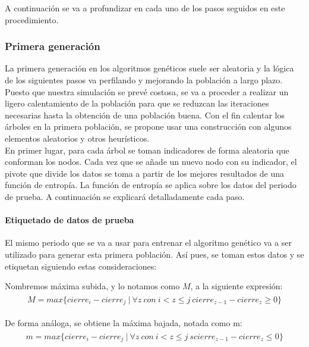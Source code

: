 A continuaci\'on se va a profundizar en cada uno de los pasos seguidos en este procedimiento.\\

\subsubsection{Primera generaci\'on}
La primera generaci\'on en los algoritmos gen\'eticos suele ser aleatoria y la l\'ogica de los siguientes pasos va perfilando y mejorando la poblaci\'on a largo plazo.\\

Puesto que nuestra simulaci\'on se prev\'e costosa, se va a proceder a realizar un ligero calentamiento de la poblaci\'on para que se reduzcan las iteraciones necesarias hasta la obtenci\'on de una poblaci\'on buena. Con el fin calentar los \'arboles en la primera poblaci\'on, se propone usar una construcci\'on con algunos elementos aleatorios y otros heur\'isticos.\\

En primer lugar, para cada \'arbol se toman indicadores de forma aleatoria que conforman los nodos. Cada vez que se a\~nade un nuevo nodo con su indicador, el pivote que divide los datos se toma a partir de los mejores resultados de una funci\'on de entrop\'ia. La funci\'on de entrop\'ia se aplica sobre los datos del periodo de prueba. A continuaci\'on se explicar\'a detalladamente cada paso. \\

\paragraph{Etiquetado de datos de prueba}
El mismo periodo que se va a usar para entrenar el algoritmo gen\'etico va a ser utilizado para generar esta primera poblaci\'on. As\'i pues, se toman estos datos y se etiquetan siguiendo estas consideraciones:

    Nombremos m\'axima subida, y lo notamos como $M$, a la siguiente expresi\'on:\\
    \begin{align*}
    \begin{split}
        M = max\{cierre_{i} - cierre_{j} \:|\: \forall z\: con \:i < z\leq j\: cierre_{z-1} - cierre_{z} \geq 0 \}
    \end{split}
    \end{align*}
    
    De forma an\'aloga, se obtiene la m\'axima bajada, notada como m:
    \begin{align*}
    \begin{split}
        m = max\{cierre_{i} - cierre_{j} \:|\: \forall z\: con \:i < z\leq j\:s cierre_{z-1} - cierre_{z} \leq 0 \}
    \end{split}
    \end{align*}

